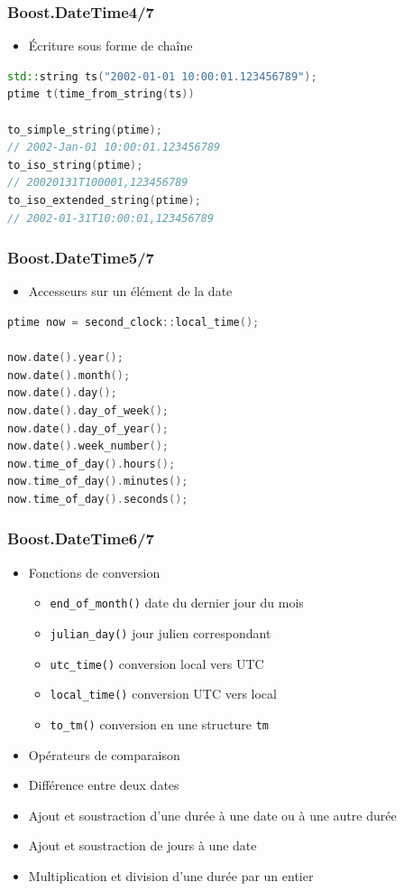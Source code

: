 \documentclass[C++.tex]{subfiles}
\begin{document}
\begin{frame}[fragile]
	\frametitle{Boost.DateTime\titlehfill{}4/7}
	\begin{itemize}
		\item Écriture sous forme de chaîne
	\end{itemize}

	\begin{lstlisting}[language=C++]
std::string ts("2002-01-01 10:00:01.123456789");
ptime t(time_from_string(ts))

to_simple_string(ptime);
// 2002-Jan-01 10:00:01.123456789
to_iso_string(ptime);
// 20020131T100001,123456789
to_iso_extended_string(ptime);
// 2002-01-31T10:00:01,123456789\end{lstlisting}
\end{frame}

\begin{frame}[fragile]
	\frametitle{Boost.DateTime\titlehfill{}5/7}
	\begin{itemize}
		\item Accesseurs sur un élément de la date
	\end{itemize}

	\begin{lstlisting}[language=C++]
ptime now = second_clock::local_time();

now.date().year();
now.date().month();
now.date().day();
now.date().day_of_week();
now.date().day_of_year();
now.date().week_number();
now.time_of_day().hours();
now.time_of_day().minutes();
now.time_of_day().seconds();\end{lstlisting}
\end{frame}

\begin{frame}[fragile]
	\frametitle{Boost.DateTime\titlehfill{}6/7}
	\begin{itemize}
		\item Fonctions de conversion
		\begin{itemize}
			\item \lstinline|end_of_month()| date du dernier jour du mois
			\item \lstinline|julian_day()| jour julien correspondant
			\item \lstinline|utc_time()| conversion local vers UTC
			\item \lstinline|local_time()| conversion UTC vers local
			\item \lstinline|to_tm()| conversion en une structure \lstinline|tm|
		\end{itemize}
		\item Opérateurs de comparaison
		\item Différence entre deux dates
		\item Ajout et soustraction d'une durée à une date ou à une autre durée
		\item Ajout et soustraction de jours à une date
		\item Multiplication et division d'une durée par un entier
	\end{itemize}
\end{frame}
\end{document}

